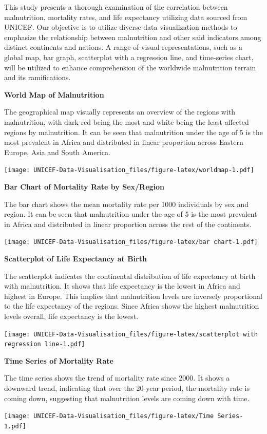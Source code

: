 \documentclass[
]{article}
\begin{document}
This study presents a thorough examination of the correlation between
malnutrition, mortality rates, and life expectancy utilizing data
sourced from UNICEF. Our objective is to utilize diverse data
visualization methods to emphasize the relationship between malnutrition
and other said indicators among distinct continents and nations. A range
of visual representations, such as a global map, bar graph, scatterplot
with a regression line, and time-series chart, will be utilized to
enhance comprehension of the worldwide malnutrition terrain and its
ramifications.

\textbf{World Map of Malnutrition}

The geographical map visually represents an overview of the regions with
malnutrition, with dark red being the most and white being the least
affected regions by malnutrition. It can be seen that malnutrition under
the age of 5 is the most prevalent in Africa and distributed in linear
proportion across Eastern Europe, Asia and South America.

\texttt{[image: UNICEF-Data-Visualisation\_files/figure-latex/worldmap-1.pdf]}

\textbf{Bar Chart of Mortality Rate by Sex/Region}

The bar chart shows the mean mortality rate per 1000 individuals by sex
and region. It can be seen that malnutrition under the age of 5 is the
most prevalent in Africa and distributed in linear proportion across the
rest of the continents.

\texttt{[image: UNICEF-Data-Visualisation\_files/figure-latex/bar chart-1.pdf]}

\textbf{Scatterplot of Life Expectancy at Birth}

The scatterplot indicates the continental distribution of life
expectancy at birth with malnutrition. It shows that life expectancy is
the lowest in Africa and highest in Europe. This implies that
malnutrition levels are inversely proportional to the life expectancy of
the regions. Since Africa shows the highest malnutrition levels overall,
life expectancy is the lowest.

\texttt{[image: UNICEF-Data-Visualisation\_files/figure-latex/scatterplot with regression line-1.pdf]}

\textbf{Time Series of Mortality Rate}

The time series shows the trend of mortality rate since 2000. It shows a
downward trend, indicating that over the 20-year period, the mortality
rate is coming down, suggesting that malnutrition levels are coming down
with time.

\texttt{[image: UNICEF-Data-Visualisation\_files/figure-latex/Time Series-1.pdf]}
\end{document}
